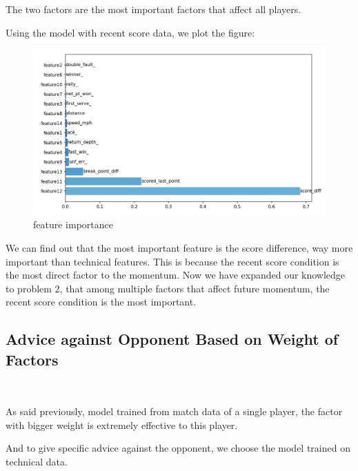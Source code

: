The two factors are the most important factors that affect all players.

Using the model with recent score data, we plot the figure:

\begin{figure}[H]
    \centering
    \includegraphics[scale=0.6]{mainmatter/imgs/weight_with_score.jpg}
    \caption{feature importance}
\end{figure}

We can find out that the most important feature is the score difference,
way more important than technical features. 
This is because the recent score condition is the most direct factor to the momentum.
Now we have expanded our knowledge to problem 2, that among multiple factors
that affect future momentum, 
the recent score condition is the most important.

\subsection{Advice against Opponent Based on Weight of Factors}~{}

As said previously, model trained from match data of a single player,
the factor with bigger weight is extremely effective to this player.

And to give specific advice against the opponent, we choose the model trained on technical data.

